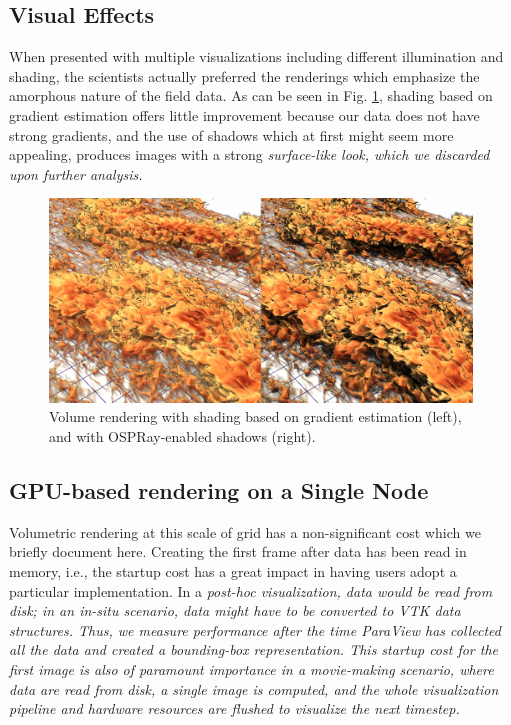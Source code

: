 \documentclass[5p,times]{elsarticle}
\begin{document}
\subsection{Visual Effects}

When presented with multiple visualizations including different illumination and
shading, the scientists actually preferred the renderings which emphasize the
amorphous nature of the field data. As can be seen in Fig. \ref{fig:shadings},
shading based on gradient estimation offers little improvement because our data
does not have strong gradients, and the use of shadows which at first might seem
more appealing, produces images with a strong \it{surface-like} \rm look, which
we discarded upon further analysis.

\begin{figure}
	\centering
	\includegraphics[width=\linewidth]{fig2montage}%
	\caption{\label{fig:shadings} Volume rendering with shading based on gradient
estimation (left), and with OSPRay-enabled shadows (right).}
\end{figure}


\subsection{GPU-based rendering on a Single Node}

Volumetric rendering at this scale of grid has a non-significant cost which we
briefly document here. Creating the first frame after data has been read in memory,
 i.e., the startup cost has a great impact in having users adopt a particular implementation.
In a \it{post-hoc} \rm visualization, data would be read from disk; in an \it{in-situ} \rm
scenario, data might have to be converted to VTK data structures. Thus, we measure performance
after the time ParaView has collected all the data and created a bounding-box representation.
This startup cost for the first image is also of paramount importance in a movie-making scenario,
where data are read from disk, a single image is computed, and the whole visualization pipeline
and hardware resources are flushed to visualize the next timestep.
\end{document}
